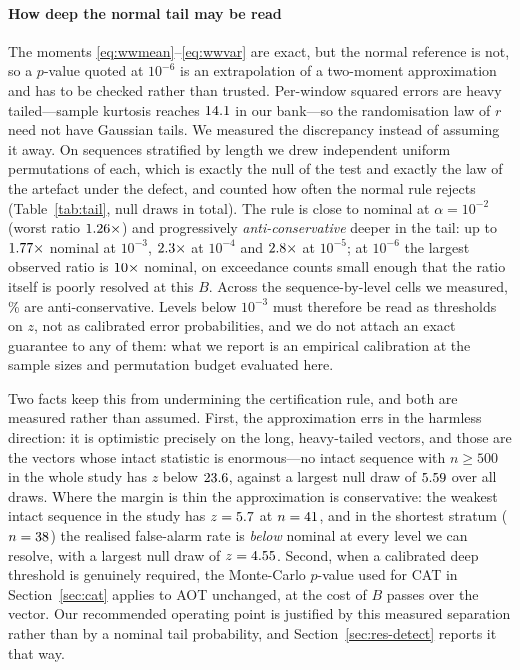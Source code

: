 \documentclass[a4paper,fleqn]{cas-sc}
\begin{document}
\paragraph{How deep the normal tail may be read}
The moments \eqref{eq:wwmean}--\eqref{eq:wwvar} are exact, but the normal
reference is not, so a $p$-value quoted at $10^{-6}$ is an extrapolation of a
two-moment approximation and has to be checked rather than trusted. Per-window
squared errors are heavy tailed---sample kurtosis reaches $14.1{}$ in
our bank---so the randomisation law of $r$ need not have Gaussian tails. We
measured the discrepancy instead of assuming it away. On \NumTailSeq{} sequences
stratified by length we drew \NumTailPerm{} independent uniform permutations of
each, which is exactly the null of the test and exactly the law of the artefact
under the defect, and counted how often the normal rule rejects
(Table~\ref{tab:tail}, \NumTailNullDraws{} null draws in total). The rule is
close to nominal at $\alpha = 10^{-2}$ (worst ratio
$1.26{}\times$) and progressively \emph{anti-conservative} deeper in
the tail: up to $1.77{}\times$ nominal at $10^{-3}$,
$2.3{}\times$ at $10^{-4}$ and $2.8{}\times$ at
$10^{-5}$; at $10^{-6}$ the largest observed ratio is
$10{}\times$ nominal, on exceedance counts small enough that the
ratio itself is poorly resolved at this $B$. Across the
\NumTailRatioAboveOneRows{} sequence-by-level cells we measured,
\NumTailRatioAboveOnePct\% are anti-conservative. Levels below $10^{-3}$ must
therefore be read as thresholds on $z$, not as calibrated error probabilities, and
we do not attach an exact guarantee to any of them: what we report is an empirical
calibration at the sample sizes and permutation budget evaluated here.

Two facts keep this from undermining the certification rule, and both are
measured rather than assumed. First, the approximation errs in the harmless
direction: it is optimistic precisely on the long, heavy-tailed vectors, and those
are the vectors whose intact statistic is enormous---no intact sequence with
$n \ge 500$ in the whole study has $z$ below $23.6{}$, against a
largest null draw of $5.59{}$ over all \NumTailNullDraws{} draws. Where
the margin is thin the approximation is conservative: the weakest intact sequence
in the study has $z = 5.7{}$ at $n = 41{}$, and in the
shortest stratum ($n = 38{}$) the realised false-alarm rate is
\emph{below} nominal at every level we can resolve, with a largest null draw of
$z = 4.55{}$. Second, when a calibrated deep threshold is genuinely
required, the Monte-Carlo $p$-value used for CAT in Section~\ref{sec:cat} applies
to AOT unchanged, at the cost of $B$ passes over the vector. Our recommended
operating point is justified by this measured separation rather than by a nominal
tail probability, and Section~\ref{sec:res-detect} reports it that way.
\end{document}
